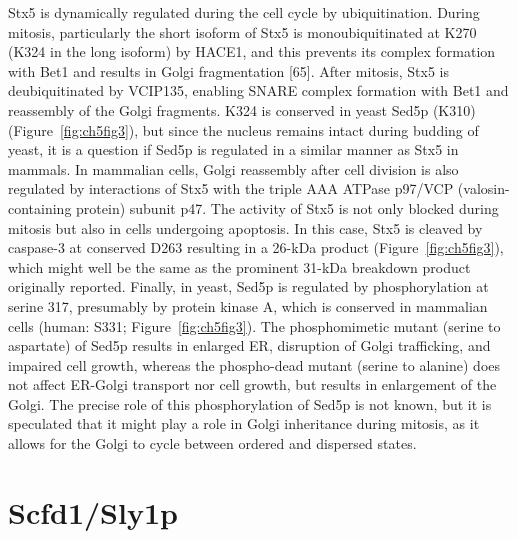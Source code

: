 Stx5 is dynamically regulated during the cell cycle by ubiquitination. During mitosis, particularly the short isoform of Stx5 is monoubiquitinated at K270 (K324 in the long isoform)\cite{huang_monoubiquitination_2016} by HACE1, and this prevents its complex formation with Bet1 and results in Golgi fragmentation\cite{huang_monoubiquitination_2016} [65]. After mitosis, Stx5 is deubiquitinated by VCIP135, enabling SNARE complex formation with Bet1 and reassembly of the Golgi fragments\cite{huang_monoubiquitination_2016,uchiyama_p97p47-mediated_2005}. K324 is conserved in yeast Sed5p (K310) (Figure~\ref{fig:ch5fig3}), but since the nucleus remains intact during budding of yeast, it is a question if Sed5p is regulated in a similar manner as Stx5 in mammals. In mammalian cells, Golgi reassembly after cell division is also regulated by interactions of Stx5 with the triple AAA ATPase p97/VCP (valosin-containing protein) subunit p47\cite{uchiyama_p97p47-mediated_2005,rabouille_syntaxin_1998}. The activity of Stx5 is not only blocked during mitosis but also in cells undergoing apoptosis. In this case, Stx5 is cleaved by caspase-3 at conserved D263 resulting in a 26-kDa product (Figure~\ref{fig:ch5fig3})\cite{lowe_caspase-mediated_2004}, which might well be the same as the prominent 31-kDa breakdown product originally reported\cite{hay_mammalian_1996}. Finally, in yeast, Sed5p is regulated by phosphorylation at serine 317, presumably by protein kinase A\cite{weinberger_control_2005}, which is conserved in mammalian cells (human: S331; Figure~\ref{fig:ch5fig3}). The phosphomimetic mutant (serine to aspartate) of Sed5p results in enlarged ER, disruption of Golgi trafficking, and impaired cell growth, whereas the phospho-dead mutant (serine to alanine) does not affect ER-Golgi transport nor cell growth, but results in enlargement of the Golgi\cite{weinberger_control_2005}. The precise role of this phosphorylation of Sed5p is not known, but it is speculated that it might play a role in Golgi inheritance during mitosis, as it allows for the Golgi to cycle between ordered and dispersed states\cite{weinberger_control_2005}.

\section{Scfd1/Sly1p}

